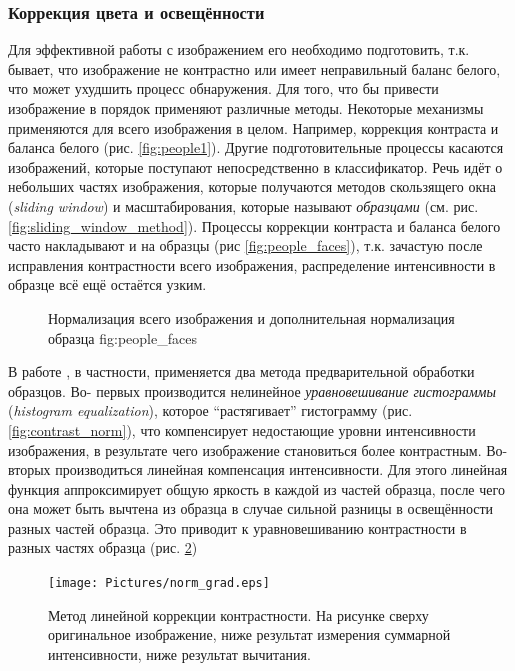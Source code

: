 \documentclass[12pt]{report}
\begin{document}
\subsubsection{Коррекция цвета и освещённости}
\label{sec:preprocessing_theor}
Для эффективной работы с изображением его необходимо подготовить, т.к. бывает, что изображение не контрастно или 
имеет неправильный баланс белого, что может ухудшить процесс обнаружения. Для того, что бы привести изображение в 
порядок применяют различные методы. Некоторые механизмы применяются для всего изображения в целом. Например, 
коррекция контраста и 
баланса белого (рис. \ref{fig:people1}). Другие подготовительные процессы касаются изображений, которые поступают 
непосредственно в классификатор. Речь идёт о небольших частях изображения, которые получаются методов скользящего 
окна (\textit{sliding window}) и масштабирования, которые называют \emph{образцами} %
 (см. рис. \ref{fig:sliding_window_method}). 
Процессы коррекции контраста и баланса белого часто накладывают и на образцы (рис \ref{fig:people_faces}), т.к. 
зачастую после исправления контрастности всего изображения, распределение интенсивности в образце всё ещё остаётся 
узким.

\begin{figure}[h]
	\centering
	\caption{Нормализация всего изображения  и дополнительная нормализация образца \subref
{fig:people_faces}}
	\label{fig:normalize_example}
\end{figure}

В работе \citep{rowley1998neural}, в частности, применяется два метода предварительной обработки образцов. Во-
первых 
производится нелинейное \emph{уравновешивание гистограммы} (\textit{histogram equalization}), которое 
``растягивает'' 
гистограмму (рис. \ref{fig:contrast_norm}), что компенсирует недостающие уровни интенсивности изображения, в 
результате чего изображение становиться 
более контрастным. Во-вторых производиться линейная компенсация интенсивности. Для этого линейная функция 
аппроксимирует общую яркость в каждой из частей образца, после чего она может быть вычтена из образца в случае 
сильной разницы в освещённости разных частей образца. Это приводит к уравновешиванию контрастности в разных частях 
образца (рис. \ref{fig:norm_grad}) 

\begin{figure}[h]
	\centering
	\texttt{[image: Pictures/norm\_grad.eps]}
	\caption{Метод линейной коррекции контрастности. На рисунке сверху оригинальное изображение, ниже результат 
измерения суммарной интенсивности, ниже результат вычитания. \citep{rowley1998neural}}
	\label{fig:norm_grad}
\end{figure}
\end{document}
